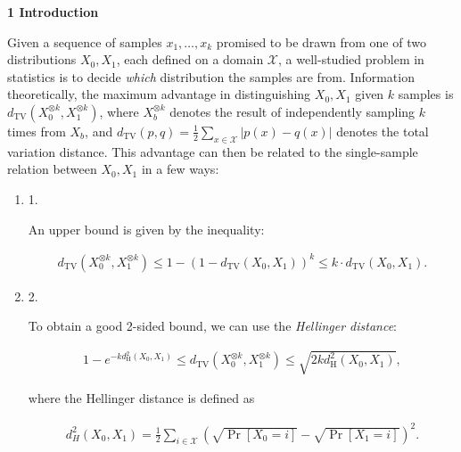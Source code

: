 

\par\medskip\noindent\textbf{
1 Introduction}\par




Given a sequence of samples $x_{1},\dots,x_{k}$ promised to be drawn from one of two distributions $X_{0},X_{1}$, each defined on a domain $\mathcal{X}$, a well-studied problem in statistics is to decide \emph{which} distribution the samples are from.
Information theoretically, the maximum advantage in distinguishing $X_{0},X_{1}$ given $k$ samples is $d_{\mathrm{TV}}(X_{0}^{\otimes k},X_{1}^{\otimes k})$, where $X_{b}^{\otimes k}$ denotes the result of independently sampling $k$ times from $X_{b}$, and $d_{\mathrm{TV}}(p,q)=\frac{1}{2}\sum_{x\in\mathcal{X}}|p(x)-q(x)|$ denotes the total variation distance. This advantage can then be related to the single-sample relation between $X_{0},X_{1}$ in a few ways:\par


\begin{enumerate}


\item[] 
1. 


An upper bound is given by the inequality:\par


\[\begin{gathered}
d_{\mathrm{TV}}(X_{0}^{\otimes k},X_{1}^{\otimes k})\leq 1-(1-d_{\mathrm{TV}}(X_{0},X_{1}))^{k}\leq k\cdot d_{\mathrm{TV}}(X_{0},X_{1}).
\end{gathered}\]





\item[] 
2. 


To obtain a good 2-sided bound, we can use the \emph{Hellinger distance}:\par


\[\begin{gathered}
1-e^{-kd^{2}_{\mathrm{H}}(X_{0},X_{1})}\leq d_{\mathrm{TV}}(X_{0}^{\otimes k},X_{1}^{\otimes k})\leq\sqrt{2kd^{2}_{\mathrm{H}}(X_{0},X_{1})},
\end{gathered}\]


where the Hellinger distance is defined as\par


\[\begin{gathered}
d^{2}_{H}(X_{0},X_{1})=\frac{1}{2}\sum_{i\in\mathcal{X}}\left(\sqrt{\Pr[X_{0}=i]}-\sqrt{\Pr[X_{1}=i]}\right)^{2}.
\end{gathered}\]





\end{enumerate}




